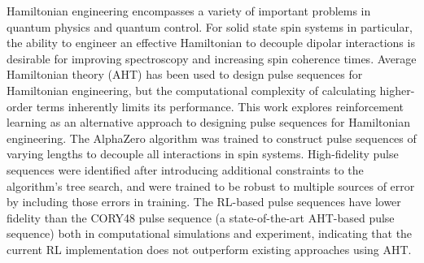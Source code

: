 

%
%
%
Hamiltonian engineering encompasses a variety of important problems in quantum physics and quantum control. For solid state spin systems in particular, the ability to engineer an effective Hamiltonian to decouple dipolar interactions is desirable for improving spectroscopy and increasing spin coherence times.
Average Hamiltonian theory (AHT) has been used to design pulse sequences for Hamiltonian engineering, but the computational complexity of calculating higher-order terms inherently limits its performance.
This work explores reinforcement learning as an alternative approach to designing pulse sequences for Hamiltonian engineering. The AlphaZero algorithm was trained to construct pulse sequences of varying lengths to decouple all interactions in spin systems. High-fidelity pulse sequences were identified after introducing additional constraints to the algorithm's tree search, and were trained to be robust to multiple sources of error by including those errors in training.
The RL-based pulse sequences have lower fidelity than the CORY48 pulse sequence (a state-of-the-art AHT-based pulse sequence) both in computational simulations and experiment, indicating that the current RL implementation does not outperform existing approaches using AHT.

